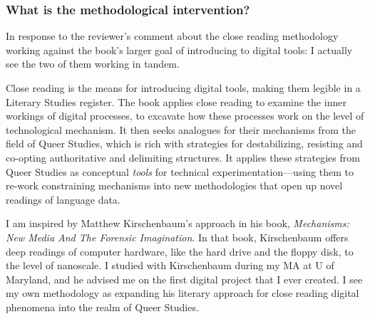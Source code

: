 \documentclass[11pt]{article}
\begin{document}
\subsubsection{What is the methodological intervention?}
\label{sec:org4c278a1}
In response to the reviewer's comment about the close reading
methodology working against the book's larger goal of introducing to
digital tools: I actually see the two of them working in tandem.

Close reading is the means for introducing digital tools, making them
legible in a Literary Studies register. The book applies close reading
to examine the inner workings of digital processes, to excavate how
these processes work on the level of technological mechanism. It then
seeks analogues for their mechanisms from the field of Queer Studies,
which is rich with strategies for destabilizing, resisting and
co-opting authoritative and delimiting structures. It applies these
strategies from Queer Studies as conceptual \emph{tools} for technical
experimentation---using them to re-work constraining mechanisms into
new methodologies that open up novel readings of language data.

I am inspired by Matthew Kirschenbaum's approach in his book,
\emph{Mechanisms: New Media And The Forensic Imagination}. In that book,
Kirschenbaum offers deep readings of computer hardware, like the hard
drive and the floppy disk, to the level of nanoscale. I studied with
Kirschenbaum during my MA at U of Maryland, and he advised me on the
first digital project that I ever created. I see my own methodology as
expanding his literary approach for close reading digital phenomena
into the realm of Queer Studies.
\end{document}
